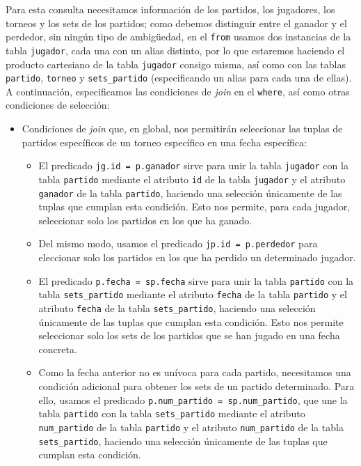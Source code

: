 \documentclass[11pt]{opticajnl}
\begin{document}
Para esta consulta necesitamos información de los partidos, los jugadores, los torneos y los sets de los partidos; como debemos distinguir entre el ganador y el perdedor, sin ningún tipo de ambigüedad, en el \texttt{from} usamos dos instancias de la tabla \texttt{jugador}, cada una con un alias distinto, por lo que estaremos haciendo el producto cartesiano de la tabla \texttt{jugador} consigo misma, así como con las tablas \texttt{partido}, \texttt{torneo} y \texttt{sets\_partido} (especificando un alias para cada una de ellas). A continuación, especificamos las condiciones de \textit{join} en el \texttt{where}, así como otras condiciones de selección:
\begin{itemize}
\item Condiciones de \textit{join} que, en global, nos permitirán seleccionar las tuplas de partidos específicos de un torneo específico en una fecha específica:
\begin{itemize}
\item El predicado \texttt{jg.id = p.ganador} sirve para unir la tabla \texttt{jugador} con la tabla \texttt{partido} mediante el atributo \texttt{id} de la tabla \texttt{jugador} y el atributo \texttt{ganador} de la tabla \texttt{partido}, haciendo una selección únicamente de las tuplas que cumplan esta condición. Esto nos permite, para cada jugador, seleccionar solo los partidos en los que ha ganado.
\item Del mismo modo, usamos el predicado \texttt{jp.id = p.perdedor} para eleccionar solo los partidos en los que ha perdido un determinado jugador. 
\item El predicado \texttt{p.fecha = sp.fecha} sirve para unir la tabla \texttt{partido} con la tabla \texttt{sets\_partido} mediante el atributo \texttt{fecha} de la tabla \texttt{partido} y el atributo \texttt{fecha} de la tabla \texttt{sets\_partido}, haciendo una selección únicamente de las tuplas que cumplan esta condición. Esto nos permite seleccionar solo los sets de los partidos que se han jugado en una fecha concreta.
\item Como la fecha anterior no es unívoca para cada partido, necesitamos una condición adicional para obtener los sets de un partido determinado. Para ello, usamos el predicado \texttt{p.num\_partido = sp.num\_partido}, que une la tabla \texttt{partido} con la tabla \texttt{sets\_partido} mediante el atributo \texttt{num\_partido} de la tabla \texttt{partido} y el atributo \texttt{num\_partido} de la tabla \texttt{sets\_partido}, haciendo una selección únicamente de las tuplas que cumplan esta condición.

\end{itemize}
\end{itemize}
\end{document}
